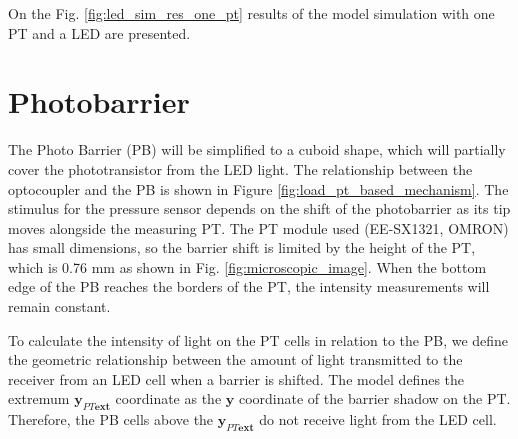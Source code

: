 On the Fig. \ref{fig:led_sim_res_one_pt} results of the model simulation with one PT and a LED are presented.

\section{Photobarrier}
The Photo Barrier (PB) will be simplified to a cuboid shape, which will partially cover the phototransistor from the LED light. The relationship between the optocoupler and the PB is shown in Figure \ref{fig:load_pt_based_mechanism}. 
The stimulus for the pressure sensor depends on the shift of the photobarrier 
as its tip moves alongside the measuring PT. 
The PT module used (EE-SX1321, OMRON) has small dimensions, 
so the barrier shift is limited by the height of the PT, which is 0.76 mm as shown in Fig. \ref{fig:microscopic_image}. 
When the bottom edge of the PB reaches the borders of the PT, 
the intensity measurements will remain constant.


To calculate the intensity of light on the PT cells in relation to the PB, 
we define the geometric relationship between the amount of light transmitted 
to the receiver from an LED cell when a barrier is shifted. 
The model defines the extremum $\boldsymbol{y_{\textit{PT}ext}}$ coordinate as 
the $\boldsymbol{y}$ coordinate of the barrier shadow on the PT. 
Therefore, the PB cells above the $\boldsymbol{y_{\textit{PT}ext}}$ do not receive light
 from the LED cell.


